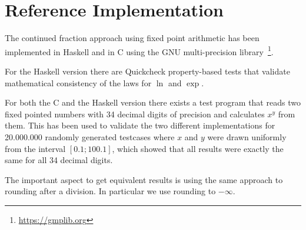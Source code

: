 \documentclass[11pt,a4paper,dvipsnames]{article}
\theoremstyle{definition}
\theoremstyle{definition}
\begin{document}
\section{Reference Implementation}
\label{sec:refer-impl}

The continued fraction approach using fixed point arithmetic has been
implemented in Haskell and in C using the GNU multi-precision
library~\footnote{\url{https://gmplib.org}}.

For the Haskell version there are Quickcheck property-based tests that validate
mathematical consistency of the laws for $\ln$ and $\exp$.

For both the C and the Haskell version there exists a test program that reads
two fixed pointed numbers with 34 decimal digits of precision and calculates
$x^{y}$ from them. This has been used to validate the two different
implementations for 20.000.000 randomly generated testcases where $x$ and $y$
were drawn uniformly from the interval $[0.1; 100.1]$, which showed that all
results were exactly the same for all 34 decimal digits.

The important aspect to get equivalent results is using the same approach to
rounding after a division. In particular we use rounding to $-\infty$.



\end{document}
